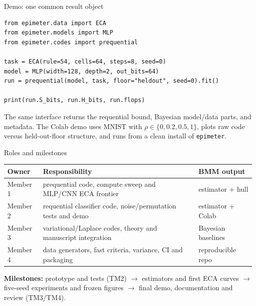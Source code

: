 \documentclass[aspectratio=43]{beamer}
\begin{document}
\begin{frame}[fragile]{Demo: one common result object}
\small
\begin{verbatim}
from epimeter.data import ECA
from epimeter.models import MLP
from epimeter.codes import prequential

task = ECA(rule=54, cells=64, steps=8, seed=0)
model = MLP(width=128, depth=2, out_bits=64)
run = prequential(model, task, floor="heldout", seed=0).fit()

print(run.S_bits, run.H_bits, run.flops)
\end{verbatim}

\medskip
The same interface returns the requential bound, Bayesian model/data parts, and metadata.
The Colab demo uses MNIST with $\rho\in\{0,0.2,0.5,1\}$, plots raw code versus held-out-floor
structure, and runs from a clean install of \texttt{epimeter}.
\end{frame}

\begin{frame}{Roles and milestones}
\begin{tabular}{p{.19\linewidth}p{.55\linewidth}p{.16\linewidth}}
\toprule
Owner & Responsibility & BMM output \\
\midrule
Member 1 & prequential code, compute sweep and MLP/CNN ECA frontier & estimator + hull \\
Member 2 & requential classifier code, noise/permutation tests and demo & estimator + Colab \\
Member 3 & variational/Laplace codes, theory and manuscript integration & Bayesian baselines \\
Member 4 & data generators, fast criteria, variance, CI and packaging & reproducible repo \\
\bottomrule
\end{tabular}

\medskip
\textbf{Milestones:} prototype and tests (TM2) $\rightarrow$ estimators and first ECA curves
$\rightarrow$ five-seed experiments and frozen figures $\rightarrow$ final demo, documentation and review (TM3/TM4).
\end{frame}
\end{document}
